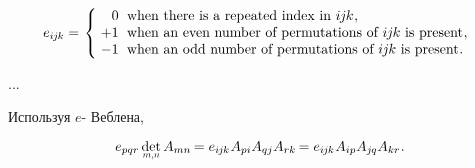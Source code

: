 \begin{otherlanguage}{russian}
\begin{tcolorbox}[enhanced, colback = green!16, before upper={\parindent2ex}, parbox = false]
\[
e_{i\hspace{-0.1ex}j\hspace{-0.1ex}k}
= \hspace{.2ex} \left\{ \hspace{-0.2em} \begin{array}{r@{\hspace{.6em}}l}
0 & \text{when there is a~repeated index in}~i\hspace{-0.1ex}j\hspace{-0.1ex}k \hspace{.1ex} , \\
+1 & \text{when an~even number of~permutations of}~i\hspace{-0.1ex}j\hspace{-0.1ex}k \text{ is present} \hspace{.1ex} , \\
-1 & \text{when an~odd number of~permutations of}~i\hspace{-0.1ex}j\hspace{-0.1ex}k \text{ is present} \hspace{.1ex} .
\end{array} \right.
\]
\end{tcolorbox}

\vspace{1mm}

...

Используя $e$\hbox{\hspace{.16ex}-\hspace{.16ex}} Веблена,   

\nopagebreak\vspace{-0.2em}\begin{equation}
e_{pqr} \hspace{.4ex} \underset{\raisebox{.12em}{\scalebox{0.7}{$m$,$n$}}}{\operatorname{det}} \, A_{mn} \hspace{-0.2ex}
= e_{i\hspace{-0.1ex}j\hspace{-0.1ex}k} \hspace{.1ex} A_{pi} A_{qj} A_{rk} \hspace{-0.2ex}
= e_{i\hspace{-0.1ex}j\hspace{-0.1ex}k} \hspace{.1ex} A_{ip} A_{j\hspace{-0.1ex}q} A_{kr}
\hspace{.1ex} .
\end{equation}


\end{otherlanguage}
